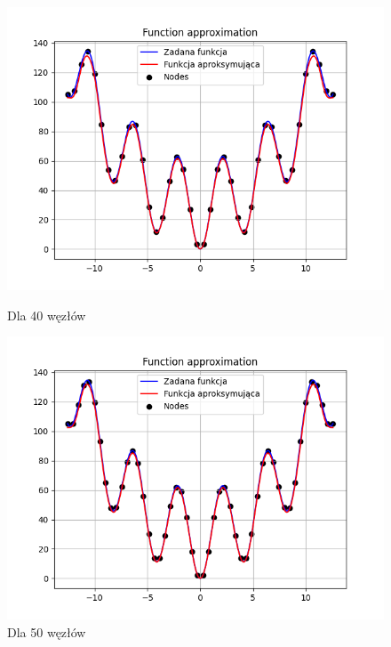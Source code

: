 \documentclass{article}
\begin{document}
\begin{figure}[H]
  \begin{minipage}[b]{0.49\textwidth}
    \begin{minipage}[b]{\textwidth}
      \includegraphics[width=\textwidth]{img44.png}
      \caption{Dla 40 węzłów}
    \end{minipage}
    \vspace*{\fill}
    \begin{minipage}[b]{\textwidth}
      \includegraphics[width=\textwidth]{img45.png}
      \caption{Dla 50 węzłów}
    \end{minipage}
  \end{minipage}
  \hfill
  \begin{minipage}[b]{0.49\textwidth}

\end{minipage}
\end{figure}
\end{document}
